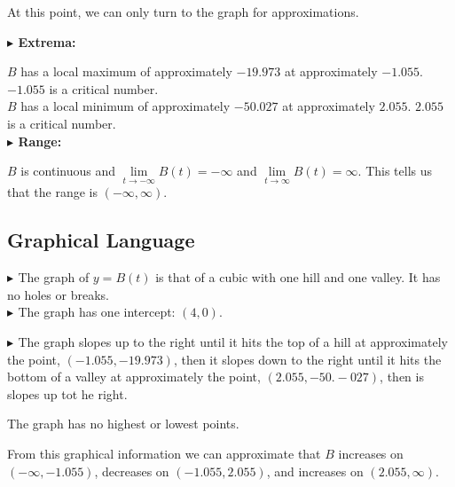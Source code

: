 \documentclass{ximera}
\begin{document}
\begin{exercise}
At this point, we can only turn to the graph for approximations.


\textbf{\textcolor{blue!55!black}{$\blacktriangleright$ Extrema: }}  

$B$ has a local maximum of approximately $-19.973$ at approximately $-1.055$.  $-1.055$ is a critical number. \\





$B$ has a local minimum of approximately $-50.027$ at approximately $2.055$.  $2.055$ is a critical number. \\









\textbf{\textcolor{blue!55!black}{$\blacktriangleright$ Range: }}


$B$ is continuous and  $\lim\limits_{t \to -\infty} B(t) = -\infty$  and $\lim\limits_{t \to \infty} B(t) = \infty$.  This tells us that the range is $(-\infty, \infty)$.








\subsection{Graphical Language}







\textbf{\textcolor{blue!55!black}{$\blacktriangleright$ }}  The graph of $y = B(t)$ is that of a cubic with one hill and one valley. It has no holes or breaks. \\

\textbf{\textcolor{blue!55!black}{$\blacktriangleright$ }}  The graph has one intercept: $(4, 0)$.









\textbf{\textcolor{blue!55!black}{$\blacktriangleright$ }}  The graph slopes up to the right until it hits the top of a hill at approximately the point, $(-1.055, -19.973)$, then it slopes down to the right until it hits the bottom of a valley at approximately the point, $(2.055, -50.-027)$, then is slopes up tot he right.



The graph has no highest or lowest points.




From this graphical information we can approximate that $B$ increases on $(-\infty, -1.055)$, decreases on $(-1.055, 2.055)$, and increases on $(2.055, \infty)$.



\end{exercise}
\end{document}
